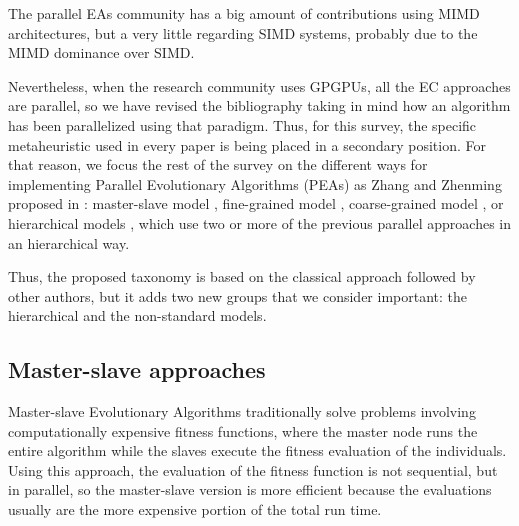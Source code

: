 \documentclass{article}
\begin{document}
The parallel EAs community has a big amount of contributions using
MIMD architectures, but a very little regarding SIMD systems, probably due to the MIMD dominance over SIMD.

Nevertheless, when the research community uses GPGPUs, all the EC approaches are parallel, so we have revised the bibliography taking in mind how an algorithm has been parallelized using that paradigm. Thus, for this survey, the specific metaheuristic used in every paper is being placed in a secondary position.
For that reason, we focus the rest of the survey on the different ways for implementing Parallel Evolutionary Algorithms (PEAs) as Zhang and Zhenming proposed in \cite{ZhangImplementationserverClient}: master-slave model \cite{man-leung-wong-parallel-2005}, fine-grained model \cite{jian_ming_li_efficient_2007}, coarse-grained model \cite{Maitre:2009:CGP:1569901.1570089}, %
or hierarchical models  \cite{DBLP:conf/gecco/PospichalMOSJ11},  which use two or more of the previous parallel approaches in an hierarchical way.



Thus, the proposed taxonomy is based on the classical approach followed by other authors, but it adds two new groups that we consider important: the hierarchical and the non-standard models.

\subsection{Master-slave approaches}
\label{subsec:serverClientapproaches}
Master-slave Evolutionary Algorithms traditionally solve problems
involving computationally expensive fitness functions, where the
master node runs the entire algorithm while the slaves execute the
fitness evaluation of the individuals. Using this approach, the
evaluation of the fitness function is not sequential, but in parallel,
so the master-slave version is more efficient because the evaluations
usually are the more expensive portion of the total run time.
\end{document}
